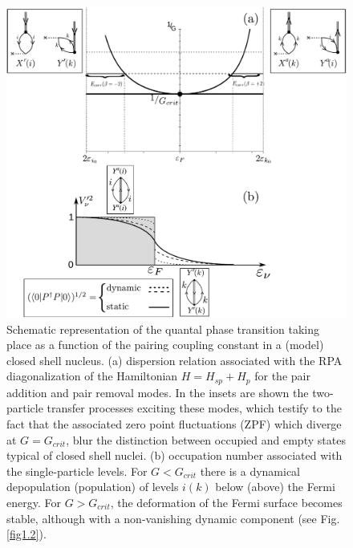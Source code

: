   \begin{figure}
  \centerline{\includegraphics*[width=\textwidth,angle=0]{nutshell/figs/fig1E6.pdf}}
  \caption{Schematic representation of the quantal phase transition taking place as a function of the pairing coupling
  constant in a (model) closed shell nucleus. (a)
  dispersion relation associated with the RPA diagonalization of the Hamiltonian
  $H = H_{sp} + H_p$ for the pair addition and pair removal modes. In the insets are
  shown the two-particle transfer processes exciting these modes, which testify to
  the fact that the associated zero point fluctuations (ZPF) which diverge at
  $G = G_{crit}$, blur the distinction between occupied and empty states typical of
  closed shell nuclei. (b) occupation number associated with the single-particle
  levels. For $G < G_{crit}$ there is a dynamical depopulation (population) of levels
  $ i(k)$ below (above) the Fermi energy. For $G > G_{crit}$,
  the deformation of the Fermi
  surface becomes stable, although with a non-vanishing dynamic component (see Fig. \ref{fig1.2}).}\label{fig1E6}
  \end{figure}
